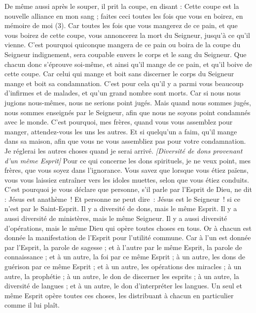 \begin{multicols}{2}
De même aussi après le souper, il prit la coupe, en disant : Cette coupe est la nouvelle alliance en mon sang ; faites ceci toutes les fois que vous en boirez, en mémoire de moi (3).
Car toutes les fois que vous mangerez de ce pain, et que vous boirez de cette coupe, vous annoncerez la mort du Seigneur, jusqu’à ce qu'il vienne.
C'est pourquoi quiconque mangera de ce pain ou boira de la coupe du Seigneur indignement, sera coupable envers le corps et le sang du Seigneur.
Que chacun donc s'éprouve soi-même, et ainsi qu'il mange de ce pain, et qu'il boive de cette coupe.
Car celui qui mange et boit sans discerner le corps du Seigneur mange et boit sa condamnation.
C’est pour cela qu’il y a parmi vous beaucoup d’infirmes et de malades, et qu’un grand nombre sont morts.
Car si nous nous jugions nous-mêmes, nous ne serions point jugés.
Mais quand nous sommes jugés, nous sommes enseignés par le Seigneur, afin que nous ne soyons point condamnés avec le monde.
C'est pourquoi, mes frères, quand vous vous assemblez pour manger, attendez-vous les uns les autres.
Et si quelqu'un a faim, qu'il mange dans sa maison, afin que vous ne vous assembliez pas pour votre condamnation. Je réglerai les autres choses quand je serai arrivé.
\textit{[Diversité de dons provenant d'un même Esprit]}
\VerseOne{}Pour ce qui concerne les dons spirituels, je ne veux point, mes frères, que vous soyez dans l’ignorance.
Vous savez que lorsque vous étiez païens, vous vous laissiez entraîner vers les idoles muettes, selon que vous étiez conduits.
C'est pourquoi je vous déclare que personne, s’il parle par l'Esprit de Dieu, ne dit : Jésus est anathème ! Et personne ne peut dire : Jésus est le Seigneur ! si ce n’est par le Saint-Esprit.
Il y a diversité de dons, mais le même Esprit.
Il y a aussi diversité de ministères, mais le même Seigneur.
Il y a aussi diversité d'opérations, mais le même Dieu qui opère toutes choses en tous.
Or à chacun est donnée la manifestation de l'Esprit pour l'utilité commune.
Car à l'un est donnée par l'Esprit, la parole de sagesse ; et à l'autre par le même Esprit, la parole de connaissance ;
et à un autre, la foi par ce même Esprit ; à un autre, les dons de guérison par ce même Esprit ;
et à un autre, les opérations des miracles ; à un autre, la prophétie ; à un autre, le don de discerner les esprits ; à un autre, la diversité de langues ; et à un autre, le don d'interpréter les langues.
Un seul et même Esprit opère toutes ces choses, les distribuant à chacun en particulier comme il lui plaît.

\end{multicols}
